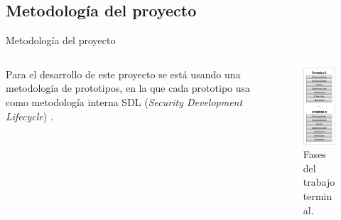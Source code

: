 \subsection{Metodología del proyecto} %
\begin{frame}{Metodología del proyecto}

  \begin{columns}

    \begin{column}{0.5\textwidth}
      Para el desarrollo de este proyecto se está usando una metodología de
      prototipos, en la que cada prototipo usa como metodología interna SDL
      (\textit{Security Development Lifecycle}) \cite{sdl}.
    \end{column}

    \begin{column}{0.5\textwidth}
      \begin{figure}[H]
        \begin{center}
          \includegraphics[width=0.5\linewidth]{diagramas/metodologia.png}
          \caption{Fases del trabajo terminal.}
        \end{center}
      \end{figure}
    \end{column}

  \end{columns}



\end{frame}

